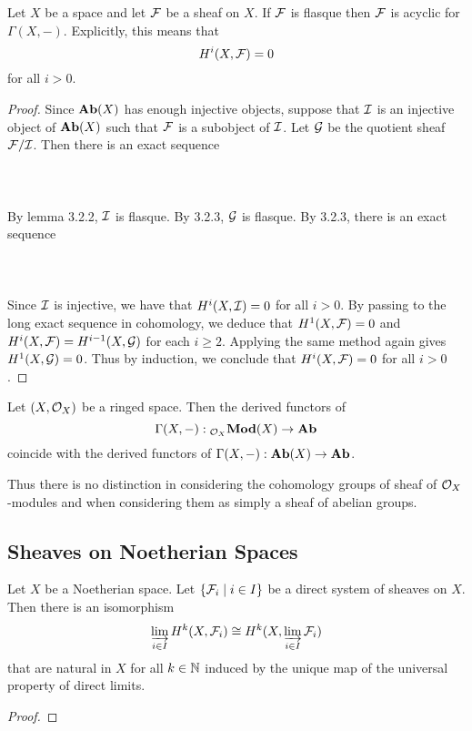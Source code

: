 \documentclass[a4paper]{article}
\begin{document}
\begin{prp}{}{} Let $X$ be a space and let $\mathcal{F}$ be a sheaf on $X$. If $\mathcal{F}$ is flasque then $\mathcal{F}$ is acyclic for $\Gamma(X,-)$. Explicitly, this means that $$H^i(X,\mathcal{F})=0$$ for all $i>0$. \tcbline
\begin{proof}
Since $\bold{Ab}(X)$ has enough injective objects, suppose that $\mathcal{I}$ is an injective object of $\bold{Ab}(X)$ such that $\mathcal{F}$ is a subobject of $\mathcal{I}$. Let $\mathcal{G}$ be the quotient sheaf $\mathcal{F}/\mathcal{I}$. Then there is an exact sequence \\~\\
\\~\\
By lemma 3.2.2, $\mathcal{I}$ is flasque. By 3.2.3, $\mathcal{G}$ is flasque. By 3.2.3, there is an exact sequence \\~\\
\\~\\
Since $\mathcal{I}$ is injective, we have that $H^i(X,\mathcal{I})=0$ for all $i>0$. By passing to the long exact sequence in cohomology, we deduce that $H^1(X,\mathcal{F})=0$ and $H^i(X,\mathcal{F})=H^{i-1}(X,\mathcal{G})$ for each $i\geq 2$. Applying the same method again gives $H^1(X,\mathcal{G})=0$. Thus by induction, we conclude that $H^i(X,\mathcal{F})=0$ for all $i>0$. 
\end{proof}
\end{prp}

\begin{prp}{}{} Let $(X,\mathcal{O}_X)$ be a ringed space. Then the derived functors of $$\Gamma(X,-):{_{\mathcal{O}_X}\bold{Mod}}(X)\to\bold{Ab}$$ coincide with the derived functors of $\Gamma(X,-):\bold{Ab}(X)\to\bold{Ab}$. 
\end{prp}

Thus there is no distinction in considering the cohomology groups of sheaf of $\mathcal{O}_X$-modules and when considering them as simply a sheaf of abelian groups. 

\subsection{Sheaves on Noetherian Spaces}
\begin{thm}{}{} Let $X$ be a Noetherian space. Let $\{\mathcal{F}_i\;|\;i\in I\}$ be a direct system of sheaves on $X$. Then there is an isomorphism $$\varinjlim_{i\in I}H^k(X,\mathcal{F}_i)\cong H^k(X,\varinjlim_{i\in I}\mathcal{F}_i)$$ that are natural in $X$ for all $k\in\mathbb{N}$ induced by the unique map of the universal property of direct limits. \tcbline
\begin{proof}
\end{proof}
\end{thm}
\end{document}
